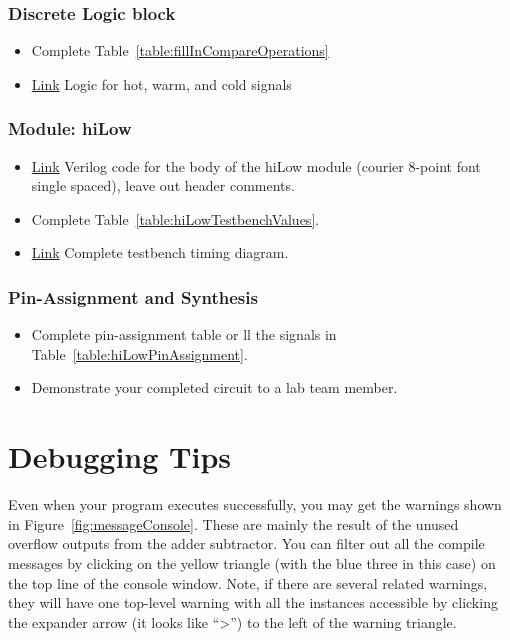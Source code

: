 \subsubsection{Discrete Logic block}
\begin{itemize}
    \item Complete Table~\ref{table:fillInCompareOperations}

    \item \protect\hyperlink{hotWarmCold_Logic}{Link} Logic for hot, warm, and cold signals
\end{itemize}

\subsubsection{Module: hiLow}

\begin{itemize}
    \item
        \protect\hyperlink{hilow-module}{Link} Verilog code for the body of
        the hiLow module (courier 8-point font single spaced), leave out
        header comments.
    \item  Complete Table~\ref{table:hiLowTestbenchValues}.
    \item  \protect\hyperlink{hilow_tb-module}{Link}  Complete testbench timing diagram.
\end{itemize}

\subsubsection{Pin-Assignment and Synthesis}
\begin{itemize}
    \item Complete pin-assignment table or ll the signals in Table~\ref{table:hiLowPinAssignment}.
    \item Demonstrate your completed circuit to a lab team member.
\end{itemize}

\section{Debugging Tips}
\label{section:hiLowHintDebugging}

Even when your program executes successfully, you may get the warnings shown in
Figure~\ref{fig:messageConsole}. These are mainly the result of the unused overflow outputs
from the adder subtractor. You can filter out all the compile messages
by clicking on the yellow triangle (with the blue three in this case) on
the top line of the console window. Note, if there are several related
warnings, they will have one top-level warning with all the instances
accessible by clicking the expander arrow (it looks like
``\textgreater'') to the left of the warning triangle.

